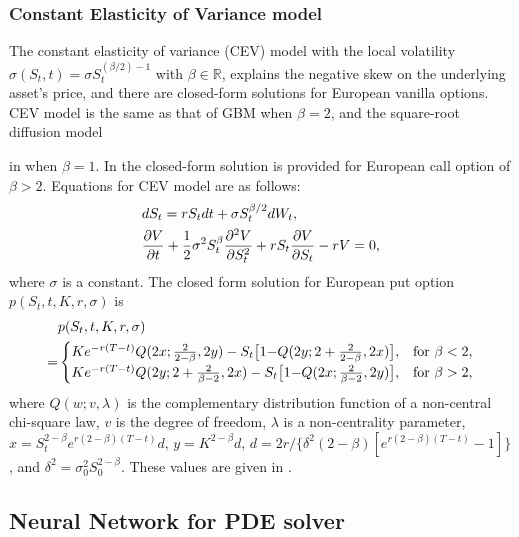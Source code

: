 \documentclass[11pt,reqno]{article}
\numberwithin{equation}{section}
\begin{document}
\subsubsection{Constant Elasticity of Variance model}
The constant elasticity of variance (CEV) model  \cite{cox1975notes}
 with the local volatility $\sigma(S_t,t)=\sigma S_t^{(\beta/2)-1}$
  with $\beta\in \mathbb R$, explains the negative skew on the underlying asset's price,
   and there are closed-form solutions for European vanilla options. 
  CEV model is the same as that of GBM when $\beta=2$,
   and the square-root diffusion model {in \cite{cox1976valuation} when $\beta=1$.
    In \cite{emanuel1982further} the closed-form solution
    is provided for European call option of $\beta>2$.
Equations for CEV model are as follows: 
\begin{align}\label{eqn:14}
&   dS_t = rS_tdt + \sigma S_t^{\beta/2}dW_t, \\ %
\notag
& \frac{\partial V}{\partial t} + \frac{1}{2} \sigma^2S_t^\beta \frac{\partial^2 V}{\partial S_t^2}
 + rS_t\frac{\partial V}{\partial S_t} - rV = 0,
\end{align}
where $\sigma$ is a constant.
The closed form solution for European put option $ p(S_t,t,K,r,\sigma) $ is
\begin{align}
\label{eqn:17:19}
& p(S_t,t,K,r,\sigma) \\
= \notag
& \begin{cases}
    Ke^{-r(T-t)}Q(2x;\frac{2}{2-\beta},2y)
    -S_t\big[1{-}Q(2y;2 + \frac{2}{2-\beta},2x)\big],
& \text{for } \beta<2,
\\
    Ke^{-r(T-t)}Q(2y;2 + \frac{2}{\beta-2},2x)
    -S_t\big[1{-}Q(2x;\frac{2}{\beta-2},2y)\big],
& \text{for } \beta>2,
\end{cases}
\end{align}
where $Q(w;v,\lambda)$ is the complementary distribution function of a non-central chi-square law,
 $v$ is the degree of freedom, $\lambda$ is a non-centrality parameter, 
 $x = S_t^{2-\beta}e^{r(2-\beta)(T-t)}d$, $y = K^{2-\beta}d$,
$d = 2r/ \big\{\delta^2(2-\beta)[e^{r(2-\beta)(T-t)}-1]\big\}$,
 and $\delta^2 = \sigma_0^2S_0^{2-\beta}$.
These values are given in \cite{lagaris1998artificial}.

\subsection{Neural Network for PDE solver}

}
\end{document}
